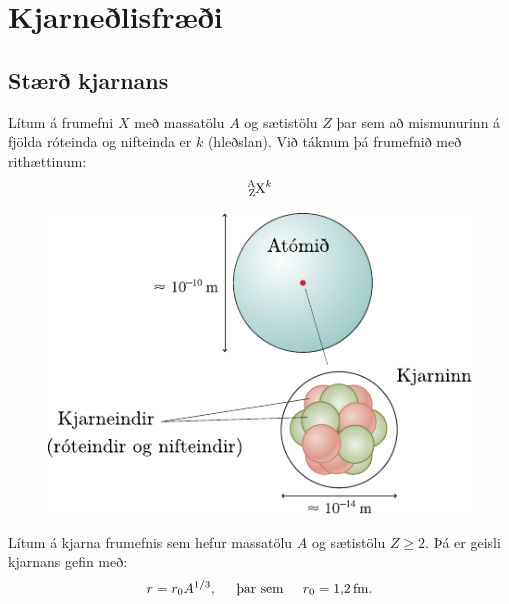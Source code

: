 \ifdefined \wholebook \else\documentclass[oneside]{book}\usepackage{EdlBook}\graphicspath{{figures/}}
\begin{document}
%
\setcounter{chapter}{23} %
%
\fi

\renewcommand{\thefigure}{\arabic{figure}}


\chapter{Kjarneðlisfræði}

\section{Stærð kjarnans}

\begin{tcolorbox}
\begin{definition}
Lítum á frumefni $X$ með massatölu $A$ og sætistölu $Z$ þar sem að mismunurinn á fjölda róteinda og nifteinda er $k$ (hleðslan). Við táknum þá frumefnið með rithættinum:
\begin{align*}
    \ce{^{A}_{Z}X^{k}}
\end{align*}
\end{definition}
\end{tcolorbox}

\begin{figure}[H]
    \centering
    \includegraphics[scale = 1]{figures/atomid-staerd.pdf}
\end{figure}

\begin{tcolorbox}
\begin{theorem}
Lítum á kjarna frumefnis sem hefur massatölu $A$ og sætistölu $Z \geq 2$. Þá er geisli kjarnans gefin með:
\begin{align*}
    r = r_0 A^{1/3}, \hspace{0.5cm} \text{þar sem} \hspace{0.5cm} r_0 = \SI{1.2}{fm}.
\end{align*}
\end{theorem}
\end{tcolorbox}
\end{document}
